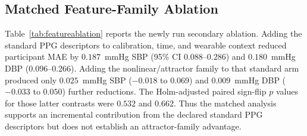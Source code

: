 \documentclass[12pt]{article}
\begin{document}
\subsection{Matched Feature-Family Ablation}
\label{sec:featureablation}
Table~\ref{tab:featureablation} reports the newly run secondary ablation. Adding the standard PPG descriptors to calibration, time, and wearable context reduced participant MAE by $0.187$~mmHg SBP (95\% CI $0.088$--$0.286$) and $0.180$~mmHg DBP ($0.096$--$0.266$). Adding the nonlinear/attractor family to that standard arm produced only $0.025$~mmHg SBP ($-0.018$ to $0.069$) and $0.009$~mmHg DBP ($-0.033$ to $0.050$) further reductions. The Holm-adjusted paired sign-flip $p$ values for those latter contrasts were $0.532$ and $0.662$. Thus the matched analysis supports an incremental contribution from the declared standard PPG descriptors but does not establish an attractor-family advantage.
\begin{table}[t]
\centering
\caption{Secondary Matched AuroraBP Feature-Family Ablation (653 Participants)}
\label{tab:featureablation}
\scriptsize
{}
\end{table}
\end{document}
